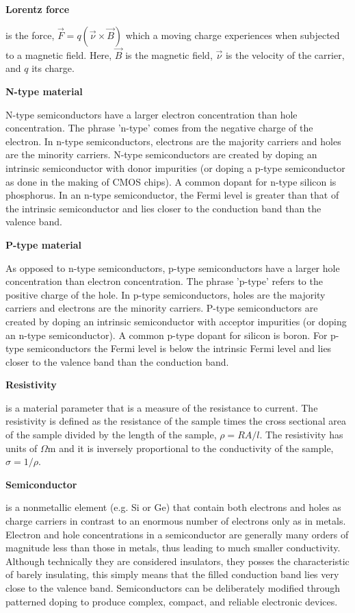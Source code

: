 \documentclass{../lab}
\begin{document}
\textbf{Lorentz force}

is the force, $\vec{F} = q(\vec{\nu} \times \vec{B}) $ which a moving charge experiences when subjected to a magnetic field. Here, $\vec{B}$ is the magnetic field, $\vec{\nu}$ is the velocity of the carrier, and $q$ its charge.

\textbf{N-type material}

N-type semiconductors have a larger electron concentration than hole concentration. The phrase 'n-type' comes from the negative charge of the electron. In n-type semiconductors, electrons are the majority carriers and holes are the minority carriers. N-type semiconductors are created by doping an intrinsic semiconductor with donor impurities (or doping a p-type semiconductor as done in the making of CMOS chips). A common dopant for n-type silicon is phosphorus. In an n-type semiconductor, the Fermi level is greater than that of the intrinsic semiconductor and lies closer to the conduction band than the valence band.

\textbf{P-type material}

As opposed to n-type semiconductors, p-type semiconductors have a larger hole concentration than electron concentration. The phrase 'p-type' refers to the positive charge of the hole. In p-type semiconductors, holes are the majority carriers and electrons are the minority carriers. P-type semiconductors are created by doping an intrinsic semiconductor with acceptor impurities (or doping an n-type semiconductor). A common p-type dopant for silicon is boron. For p-type semiconductors the Fermi level is below the intrinsic Fermi level and lies closer to the valence band than the conduction band.

\textbf{Resistivity}

is a material parameter that is a measure of the resistance to current. The resistivity is defined as the resistance of the sample times the cross sectional area of the sample divided by the length of the sample, $\rho = RA/l$. The resistivity has units of $\Omega$m and it is inversely proportional to the conductivity of the sample, $\sigma = 1/\rho$.

\textbf{Semiconductor}

is a nonmetallic element (e.g. Si or Ge) that contain both electrons and holes as charge carriers in contrast to an enormous number of electrons only as in metals. Electron and hole concentrations in a semiconductor are generally many orders of magnitude less than those in metals, thus leading to much smaller conductivity. Although technically they are considered insulators, they posses the characteristic of barely insulating, this simply means that the filled conduction band lies very close to the valence band. Semiconductors can be deliberately modified through patterned doping to produce complex, compact, and reliable electronic devices.
\end{document}
